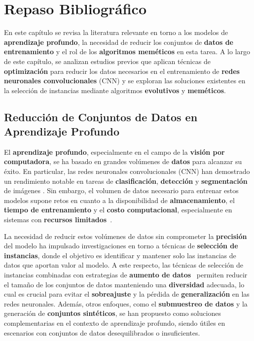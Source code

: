 \chapter{Repaso Bibliográfico}\label{ch:repaso-bibliografico}
En este capítulo se revisa la literatura relevante en torno a los modelos de \textbf{aprendizaje profundo}, la
necesidad de reducir los conjuntos de \textbf{datos de entrenamiento} y el rol de los \textbf{algoritmos meméticos} en
esta tarea.
A lo largo de este capítulo, se analizan estudios previos que aplican técnicas de \textbf{optimización} para reducir
los datos necesarios en el entrenamiento de \textbf{redes neuronales convolucionales} (CNN) y se exploran las
soluciones existentes en la selección de instancias mediante algoritmos \textbf{evolutivos} y \textbf{meméticos}.


\section{Reducción de Conjuntos de Datos en Aprendizaje Profundo}
\label{sec:reduccion-de-conjuntos-de-datos-en-aprendizaje-profundo}
El \textbf{aprendizaje profundo}, especialmente en el campo de la \textbf{visión por computadora}, se ha basado en
grandes volúmenes de \textbf{datos} para alcanzar su éxito.
En particular, las redes neuronales convolucionales (CNN) han demostrado un rendimiento notable en tareas de
\textbf{clasificación}, \textbf{detección} y \textbf{segmentación} de imágenes \cite{goodfellow_deep_2016}.
Sin embargo, el volumen de datos necesario para entrenar estos modelos supone retos en cuanto a la disponibilidad de
\textbf{almacenamiento}, el \textbf{tiempo de entrenamiento} y el \textbf{costo computacional}, especialmente en
sistemas con \textbf{recursos limitados}~\cite{lecun_deep_2015}.


La necesidad de reducir estos volúmenes de datos sin comprometer la \textbf{precisión} del modelo ha impulsado
investigaciones en torno a técnicas de \textbf{selección de instancias}, donde el objetivo es identificar y mantener
solo las instancias de datos que aportan valor al modelo.
A este respecto, las técnicas de selección de instancias combinadas con estrategias de
\textbf{aumento de datos}~\cite{shorten_survey_2019} permiten reducir el tamaño de los conjuntos de datos
manteniendo una \textbf{diversidad} adecuada, lo cual es crucial para evitar el \textbf{sobreajuste} y la pérdida de
\textbf{generalización} en las redes neuronales.
Además, otros enfoques, como el \textbf{submuestreo de datos} y la generación de \textbf{conjuntos sintéticos}, se han
propuesto como soluciones complementarias en el contexto de aprendizaje profundo, siendo útiles en escenarios con
conjuntos de datos desequilibrados o insuficientes.



